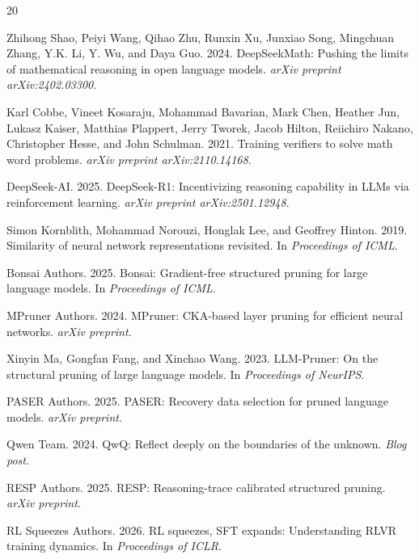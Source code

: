\documentclass[11pt,a4paper]{article}
\begin{document}
\begin{thebibliography}{20}

Zhihong Shao, Peiyi Wang, Qihao Zhu, Runxin Xu, Junxiao Song, Mingchuan Zhang, Y.K. Li, Y. Wu, and Daya Guo. 2024.
\newblock DeepSeekMath: Pushing the limits of mathematical reasoning in open language models.
\newblock \emph{arXiv preprint arXiv:2402.03300}.

Karl Cobbe, Vineet Kosaraju, Mohammad Bavarian, Mark Chen, Heather Jun, Lukasz Kaiser, Matthias Plappert, Jerry Tworek, Jacob Hilton, Reiichiro Nakano, Christopher Hesse, and John Schulman. 2021.
\newblock Training verifiers to solve math word problems.
\newblock \emph{arXiv preprint arXiv:2110.14168}.

DeepSeek-AI. 2025.
\newblock DeepSeek-R1: Incentivizing reasoning capability in LLMs via reinforcement learning.
\newblock \emph{arXiv preprint arXiv:2501.12948}.

Simon Kornblith, Mohammad Norouzi, Honglak Lee, and Geoffrey Hinton. 2019.
\newblock Similarity of neural network representations revisited.
\newblock In \emph{Proceedings of ICML}.

Bonsai Authors. 2025.
\newblock Bonsai: Gradient-free structured pruning for large language models.
\newblock In \emph{Proceedings of ICML}.

MPruner Authors. 2024.
\newblock MPruner: CKA-based layer pruning for efficient neural networks.
\newblock \emph{arXiv preprint}.

Xinyin Ma, Gongfan Fang, and Xinchao Wang. 2023.
\newblock LLM-Pruner: On the structural pruning of large language models.
\newblock In \emph{Proceedings of NeurIPS}.

PASER Authors. 2025.
\newblock PASER: Recovery data selection for pruned language models.
\newblock \emph{arXiv preprint}.

Qwen Team. 2024.
\newblock QwQ: Reflect deeply on the boundaries of the unknown.
\newblock \emph{Blog post}.

RESP Authors. 2025.
\newblock RESP: Reasoning-trace calibrated structured pruning.
\newblock \emph{arXiv preprint}.

RL Squeezes Authors. 2026.
\newblock RL squeezes, SFT expands: Understanding RLVR training dynamics.
\newblock In \emph{Proceedings of ICLR}.


\end{thebibliography}
\end{document}
